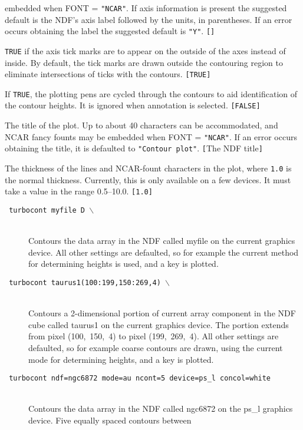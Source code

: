 \documentclass[twoside,11pt]{article}
\newcommand{\htmlref}[2]{#1}
\newcommand{\sstexamples}[1]{
   \goodbreak
   \item[Examples:] \mbox{} \\
   \vspace{-3.5ex}
   \begin{description}
      #1
   \end{description}
}
\newcommand{\sstsubsection}[1]{ \item[{#1}] \mbox{} \\}
\newcommand{\sstexamplesubsection}[2]{\sloppy \item{\ssttt #1} \mbox{} \\ #2 }
\newcommand{\ssttt}{\tt}
\renewcommand{\sstexamples}[1]{
      \htmlref{\item[Examples:]}{ap:example}
      \begin{description}
         #1
      \end{description}
   }
\renewcommand{\sstsubsection}[1]{\item[{#1}]}
\renewcommand{\sstexamplesubsection}[2]{\item[{\ssttt #1}] \\ #2}
\begin{document}
{{{         embedded when FONT = {\tt "NCAR"}.  If axis information is
         present the suggested default is the NDF's axis label followed
         by the units, in parentheses.  If an error occurs obtaining
         the label the suggested default is {\tt "Y"}. {\tt []}
      }
      \sstsubsection{
         OUTTIC = \_LOGICAL (Read)
      }{
         {\tt TRUE} if the axis tick marks are to appear on the outside of
         the axes instead of inside.  By default, the tick marks are
         drawn outside the contouring region to eliminate
         intersections of ticks with the contours. {\tt [TRUE]}
      }
      \sstsubsection{
         PENROT = \_LOGICAL (Read)
      }{
         If {\tt TRUE}, the plotting pens are cycled through the contours to
         aid identification of the contour heights.  It is ignored
         when annotation is selected. {\tt [FALSE]}
      }
      \sstsubsection{
         PLTITL = LITERAL (Read)
      }{
         The title of the plot.  Up to about 40 characters can be
         accommodated, and NCAR fancy founts may be embedded when
         FONT = {\tt "NCAR"}.  If an error occurs obtaining the title, it
         is defaulted to {\tt "Contour plot"}. {\tt [}The NDF title{\tt ]}
      }
      \sstsubsection{
         THICK = \_REAL (Read)
      }{
         The thickness of the lines and NCAR-fount characters in the plot, where
         {\tt 1.0} is the normal thickness.  Currently, this is only available
         on a few devices.  It must take a value in the range 0.5--10.0.
         {\tt [1.0]}
      }
   }
   \sstexamples{
      \sstexamplesubsection{
         turbocont myfile D $\backslash$
      }{
         Contours the data array in the NDF called myfile on the current
         graphics device.  All other settings are defaulted, so for
         example the current method for determining heights is used, and
         a key is plotted.
      }
      \sstexamplesubsection{
         turbocont taurus1(100:199,150:269,4) $\backslash$
      }{
         Contours a 2-dimensional portion of current array component in
         the NDF cube called taurus1 on the current graphics device.
         The portion extends from pixel (100,~150,~4) to pixel
         (199,~269,~4).  All other settings are defaulted, so for example
         coarse contours are drawn, using the current mode for
         determining heights, and a key is plotted.
      }
      \sstexamplesubsection{
         turbocont ndf=ngc6872 mode=au ncont=5 device=ps\_l concol=white
      }{
         Contours the data array in the NDF called ngc6872 on the
         ps\_l graphics device.  Five equally spaced contours between
}}}
\end{document}
